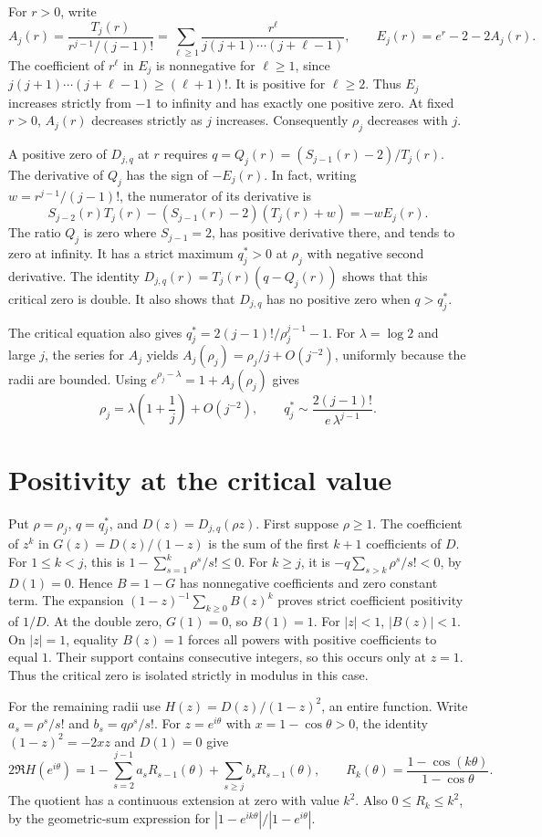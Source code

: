 \documentclass[11pt]{article}
\begin{document}
For $r>0$, write
\[
A_j(r)=\frac{T_j(r)}{r^{j-1}/(j-1)!}
      =\sum_{\ell\ge1}\frac{r^\ell}{j(j+1)\cdots(j+\ell-1)},
\qquad E_j(r)=e^r-2-2A_j(r).
\]
The coefficient of $r^\ell$ in $E_j$ is nonnegative for $\ell\ge1$, since $j(j+1)\cdots(j+\ell-1)\ge(\ell+1)!$. It is positive for $\ell\ge2$. Thus $E_j$ increases strictly from $-1$ to infinity and has exactly one positive zero. At fixed $r>0$, $A_j(r)$ decreases strictly as $j$ increases. Consequently $\rho_j$ decreases with $j$.

A positive zero of $D_{j,q}$ at $r$ requires $q=Q_j(r)=(S_{j-1}(r)-2)/T_j(r)$. The derivative of $Q_j$ has the sign of $-E_j(r)$. In fact, writing $w=r^{j-1}/(j-1)!$, the numerator of its derivative is
\[
S_{j-2}(r)T_j(r)-(S_{j-1}(r)-2)(T_j(r)+w)
=-wE_j(r).
\]
The ratio $Q_j$ is zero where $S_{j-1}=2$, has positive derivative there, and tends to zero at infinity. It has a strict maximum $q_j^*>0$ at $\rho_j$ with negative second derivative. The identity $D_{j,q}(r)=T_j(r)(q-Q_j(r))$ shows that this critical zero is double. It also shows that $D_{j,q}$ has no positive zero when $q>q_j^*$.

The critical equation also gives $q_j^*=2(j-1)!/\rho_j^{j-1}-1$. For $\lambda=\log 2$ and large $j$, the series for $A_j$ yields $A_j(\rho_j)=\rho_j/j+O(j^{-2})$, uniformly because the radii are bounded. Using $e^{\rho_j-\lambda}=1+A_j(\rho_j)$ gives
\[
\rho_j=\lambda\left(1+\frac1j\right)+O(j^{-2}),
\qquad q_j^*\sim \frac{2(j-1)!}{e\,\lambda^{j-1}}.
\]

\section{Positivity at the critical value}

Put $\rho=\rho_j$, $q=q_j^*$, and $D(z)=D_{j,q}(\rho z)$. First suppose $\rho\ge1$. The coefficient of $z^k$ in $G(z)=D(z)/(1-z)$ is the sum of the first $k+1$ coefficients of $D$. For $1\le k<j$, this is $1-\sum_{s=1}^k\rho^s/s!\le0$. For $k\ge j$, it is $-q\sum_{s>k}\rho^s/s!<0$, by $D(1)=0$. Hence $B=1-G$ has nonnegative coefficients and zero constant term. The expansion $(1-z)^{-1}\sum_{k\ge0}B(z)^k$ proves strict coefficient positivity of $1/D$. At the double zero, $G(1)=0$, so $B(1)=1$. For $|z|<1$, $|B(z)|<1$. On $|z|=1$, equality $B(z)=1$ forces all powers with positive coefficients to equal $1$. Their support contains consecutive integers, so this occurs only at $z=1$. Thus the critical zero is isolated strictly in modulus in this case.

For the remaining radii use $H(z)=D(z)/(1-z)^2$, an entire function. Write $a_s=\rho^s/s!$ and $b_s=q\rho^s/s!$. For $z=e^{i\theta}$ with $x=1-\cos\theta>0$, the identity $(1-z)^2=-2xz$ and $D(1)=0$ give
\[
2\Re H(e^{i\theta})=1-\sum_{s=2}^{j-1}a_s R_{s-1}(\theta)+\sum_{s\ge j}b_s R_{s-1}(\theta),
\qquad R_k(\theta)=\frac{1-\cos(k\theta)}{1-\cos\theta}.
\]
The quotient has a continuous extension at zero with value $k^2$. Also $0\le R_k\le k^2$, by the geometric-sum expression for $|1-e^{ik\theta}|/|1-e^{i\theta}|$.
\end{document}
